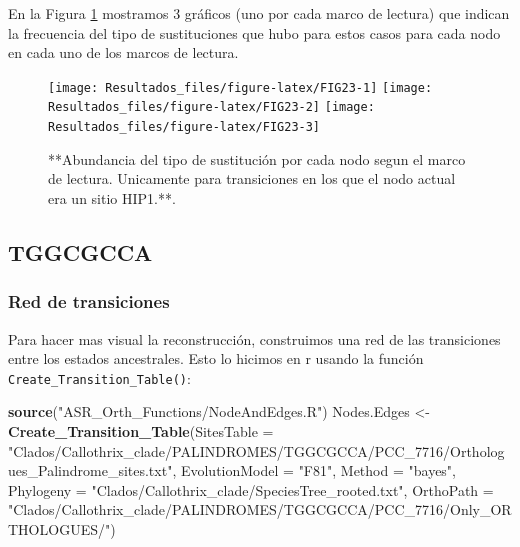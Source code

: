 \documentclass[
]{book}
\newenvironment{Shaded}{\begin{snugshade}}{\end{snugshade}}
\newcommand{\AttributeTok}[1]{\textcolor[rgb]{0.13,0.29,0.53}{#1}}
\newcommand{\FunctionTok}[1]{\textcolor[rgb]{0.13,0.29,0.53}{\textbf{#1}}}
\newcommand{\NormalTok}[1]{#1}
\newcommand{\OtherTok}[1]{\textcolor[rgb]{0.56,0.35,0.01}{#1}}
\newcommand{\StringTok}[1]{\textcolor[rgb]{0.31,0.60,0.02}{#1}}
\begin{document}
En la Figura \ref{fig:FIG23} mostramos 3 gráficos (uno por cada marco de lectura) que indican la frecuencia del tipo de sustituciones que hubo para estos casos para cada nodo en cada uno de los marcos de lectura.

\begin{figure}

{\centering \texttt{[image: Resultados\_files/figure-latex/FIG23-1]} \texttt{[image: Resultados\_files/figure-latex/FIG23-2]} \texttt{[image: Resultados\_files/figure-latex/FIG23-3]} 

}

\caption{**Abundancia del tipo de sustitución por cada nodo segun el marco de lectura. Unicamente para transiciones en los que el nodo actual era un sitio HIP1.**.}\label{fig:FIG23}
\end{figure}

\hypertarget{tggcgcca}{%
\subsection{TGGCGCCA}\label{tggcgcca}}

\hypertarget{red-de-transiciones-1}{%
\subsubsection{Red de transiciones}\label{red-de-transiciones-1}}

Para hacer mas visual la reconstrucción, construimos una red de las transiciones entre los estados ancestrales. Esto lo hicimos en r usando la función \texttt{Create\_Transition\_Table()}:

\begin{Shaded}
\begin{Highlighting}[]
\FunctionTok{source}\NormalTok{(}\StringTok{"ASR\_Orth\_Functions/NodeAndEdges.R"}\NormalTok{)}
\NormalTok{Nodes.Edges }\OtherTok{\textless{}{-}} \FunctionTok{Create\_Transition\_Table}\NormalTok{(}\AttributeTok{SitesTable =} \StringTok{"Clados/Callothrix\_clade/PALINDROMES/TGGCGCCA/PCC\_7716/Orthologues\_Palindrome\_sites.txt"}\NormalTok{,}
                                \AttributeTok{EvolutionModel =} \StringTok{"F81"}\NormalTok{,}
                                \AttributeTok{Method =} \StringTok{"bayes"}\NormalTok{,}
                                \AttributeTok{Phylogeny =} \StringTok{"Clados/Callothrix\_clade/SpeciesTree\_rooted.txt"}\NormalTok{,}
                                \AttributeTok{OrthoPath =} \StringTok{"Clados/Callothrix\_clade/PALINDROMES/TGGCGCCA/PCC\_7716/Only\_ORTHOLOGUES/"}\NormalTok{)}
\end{Highlighting}
\end{Shaded}
\end{document}
